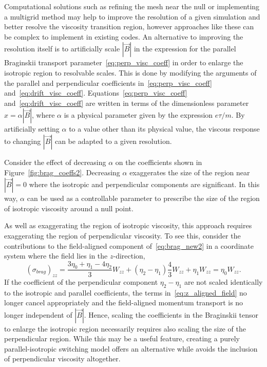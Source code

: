 Computational solutions such as refining the mesh near the null or implementing a multigrid method may help to improve the resolution of a given simulation and better resolve the viscosity transition region, however approaches like these can be complex to implement in existing codes. An alternative to improving the resolution itself is to artificially scale $|\vec{B}|$ in the expression for the parallel Braginskii transport parameter~\ref{eq:perp_visc_coeff} in order to enlarge the isotropic region to resolvable scales. This is done by modifying the arguments of the parallel and perpendicular coefficients in~\ref{eq:perp_visc_coeff} and~\ref{eq:drift_visc_coeff}. Equations~\ref{eq:perp_visc_coeff} and~\ref{eq:drift_visc_coeff} are written in terms of the dimensionless parameter $x = \alpha |\vec{B}|$, where $\alpha$ is a physical parameter given by the expression $e \tau / m$. By artificially setting $\alpha$ to a value other than its physical value, the viscous response to changing $|\vec{B}|$ can be adapted to a given resolution.

Consider the effect of decreasing $\alpha$ on the coefficients shown in Figure~\ref{fig:brag_coeffs2}. Decreasing $\alpha$ exaggerates the size of the region near $|\vec{B}| = 0$ where the isotropic and perpendicular components are significant. In this way, $\alpha$ can be used as a controllable parameter to prescribe the size of the region of isotropic viscosity around a null point.

As well as exaggerating the region of isotropic viscosity, this approach requires exaggerating the region of perpendicular viscosity. To see this, consider the contributions to the field-aligned component of~\ref{eq:brag_new2} in a coordinate system where the field lies in the $z$-direction,
\begin{equation}
  \label{eq:z_aligned_field}
(\sigma_{brag})_{zz} = \frac{3\eta_0+\eta_1-4\eta_2}{3} W_{zz} + (\eta_2 - \eta_1) \frac{4}{3} W_{zz} + \eta_1 W_{zz} = \eta_0 W_{zz}.
\end{equation}
If the coefficient of the perpendicular component $\eta_2 - \eta_1$ are not scaled identically to the isotropic and parallel coefficients, the terms in~\ref{eq:z_aligned_field} no longer cancel appropriately and the field-aligned momentum transport is no longer independent of $|\vec{B}|$. Hence, scaling the coefficients in the Braginskii tensor to enlarge the isotropic region necessarily requires also scaling the size of the perpendicular region. While this may be a useful feature, creating a purely parallel-isotropic switching model offers an alternative while avoids the inclusion of perpendicular viscosity altogether.

